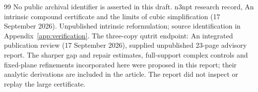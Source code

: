 \documentclass[11pt,a4paper]{article}
\theoremstyle{definition}\newtheorem{definition}[theorem]{Definition}
\theoremstyle{remark}\newtheorem{remark}[theorem]{Remark}
\numberwithin{equation}{section}
\begin{document}
\begin{thebibliography}{99}
No public archival identifier is asserted in this draft.
n3npt research record, An intrinsic compound certificate and the limits
of cubic simplification (17 September 2026).
Unpublished intrinsic reformulation; source identification in
Appendix~\ref{app:verification}.
The three-copy qutrit endpoint: An integrated publication review
(17 September 2026), supplied unpublished 23-page advisory report.
The sharper gap and repair estimates, full-support complex controls
and fixed-plane refinements incorporated here were proposed in this
report; their analytic derivations are included in the article.
The report did not inspect or replay the large certificate.
\end{thebibliography}
\end{document}

